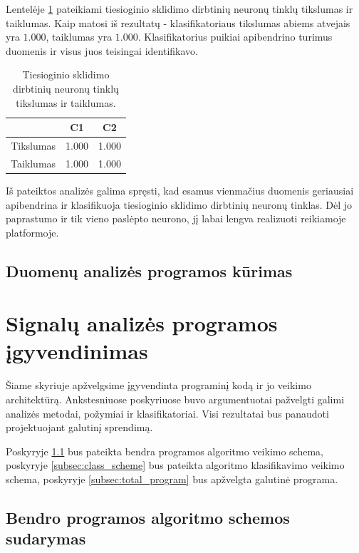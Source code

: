 \documentclass[]{vgtuef}
\begin{document}
Lentelėje \ref{table:ffn_scores} pateikiami tiesioginio sklidimo
dirbtinių neuronų tinklų tikslumas ir taiklumas. Kaip matosi iš
rezultatų - klasifikatoriaus tikslumas abiems atvejais yra $1.000$,
taiklumas yra $1.000$. Klasifikatorius puikiai apibendrino turimus
duomenis ir visus juos teisingai identifikavo.

\begin{table}[t]
  \centering
  \caption{Tiesioginio sklidimo dirbtinių neuronų tinklų tikslumas ir taiklumas.}
  \label{table:ffn_scores}
  \begin{tabular}{|c|c|c|} \hline
    & C1 & C2 \\ \hline
    Tikslumas & 1.000 & 1.000 \\ \hline
    Taiklumas & 1.000 & 1.000 \\ \hline
  \end{tabular}
\end{table}

Iš pateiktos analizės galima spręsti, kad esamus vienmačius duomenis
geriausiai apibendrina ir klasifikuoja tiesioginio sklidimo dirbtinių
neuronų tinklas. Dėl jo paprastumo ir tik vieno paslėpto neurono, jį
labai lengva realizuoti reikiamoje platformoje.

\subsection{Duomenų analizės programos kūrimas}


\section{Signalų analizės programos įgyvendinimas}

Šiame skyriuje apžvelgsime įgyvendinta programinį kodą ir jo veikimo
architektūrą. Ankstesniuose poskyriuose buvo argumentuotai pažvelgti
galimi analizės metodai, požymiai ir klasifikatoriai. Visi rezultatai
bus panaudoti projektuojant galutinį sprendimą.

Poskyryje \ref{subsec:total_scheme} bus pateikta bendra programos
algoritmo veikimo schema, poskyryje \ref{subsec:class_scheme} bus
pateikta algoritmo klasifikavimo veikimo schema, poskyryje
\ref{subsec:total_program} bus apžvelgta galutinė programa.


\subsection{Bendro programos algoritmo schemos sudarymas}
\label{subsec:total_scheme}
\end{document}
